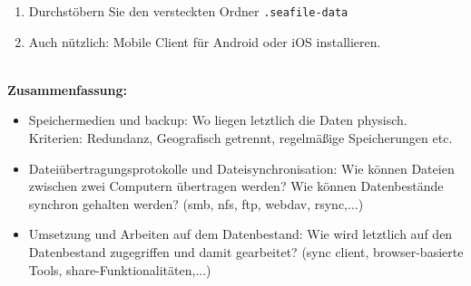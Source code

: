 {\begin{enumerate}
\begin{itemize}
			\item Die benötigten WebDAV Parameter für Ihren entsprechenden Client (zb Browser, Dateimanager) sind dann:
			\begin{itemize}
				\item server=seafile.rlp.net/seafdav
				\item username=<ZIMK-Kennung>@uni-trier.de
				\item password=<das-oben-gesetzte-Pwd>
			\end{itemize}
			\item Zugriff
			\begin{itemize}
				\item im Browser: https://seafile.rlp.net/seafdav
				\item im Dateimanager Nautilus: davs://seafile.rlp.net/seafdav
			\end{itemize}
		\end{itemize}
			\item Durchstöbern Sie den versteckten Ordner \texttt{.seafile-data}
	\item Auch nützlich: Mobile Client für Android oder iOS installieren.
\end{enumerate}}
~\\
\textbf{Zusammenfassung:}
\begin{itemize}
	\item Speichermedien und backup: Wo liegen letztlich die Daten physisch. Kriterien: Redundanz, Geografisch getrennt, regelmäßige Speicherungen etc.
	\item Dateiübertragungsprotokolle und Dateisynchronisation: Wie können Dateien zwischen zwei Computern übertragen werden? Wie können Datenbestände synchron gehalten werden? (smb, nfs, ftp, webdav, rsync,...)
	\item Umsetzung und Arbeiten auf dem Datenbestand: Wie wird letztlich auf den Datenbestand zugegriffen und damit gearbeitet? (sync client, browser-basierte Tools, share-Funktionalitäten,...)
\end{itemize}
